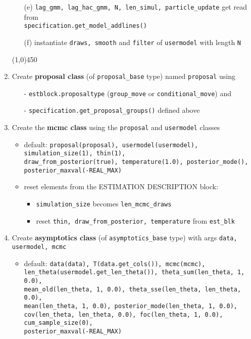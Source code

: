 \documentclass[11pt, letterpaper, notitlepage]{article}
\begin{document}
\begin{enumerate}
\begin{enumerate}
\begin{itemize}
          \end{itemize}
\item[(e)] \texttt{lag\_gmm, lag\_hac\_gmm, N, len\_simul, particle\_update} get read from\\ \texttt{specification.get\_model\_addlines()}
\item[(f)] instantiate \texttt{draws, smooth} and \texttt{filter} of \texttt{usermodel} with length \texttt{N}
\end{enumerate}

\begin{center}
\line(1,0){450}
\end{center}

\item Create \textbf{proposal class} (of \texttt{proposal\_base} type) named \texttt{proposal} using 
\begin{itemize}
\item[-] \texttt{estblock.proposaltype} (\texttt{group\_move} or \texttt{conditional\_move}) and
\item[-] \texttt{specification.get\_proposal\_groups()} defined above
\end{itemize}
 
 \item Create the \textbf{mcmc class} using the \texttt{proposal} and \texttt{usermodel} classes
 \begin{itemize}
 \item default: \texttt{proposal(proposal), usermodel(usermodel), simulation\_size(1), thin(1), \\
               draw\_from\_posterior(true), temperature(1.0), posterior\_mode(), \\ posterior\_maxval(-REAL\_MAX)}
 \item reset elements from the ESTIMATION DESCRIPTION block:
\begin{itemize}
\item \texttt{simulation\_size} becomes \texttt{len\_mcmc\_draws}
\item reset \texttt{thin, draw\_from\_posterior, temperature} from \texttt{est\_blk}
\end{itemize}        
\end{itemize}
\item Create \textbf{asymptotics class} (of \texttt{asymptotics\_base} type) with args \texttt{data, usermodel, mcmc}
\begin{itemize}
\item default: \texttt{data(data), T(data.get\_cols()), mcmc(mcmc), \\
len\_theta(usermodel.get\_len\_theta()), theta\_sum(len\_theta, 1, 0.0), \\ mean\_old(len\_theta, 1, 0.0), theta\_sse(len\_theta, len\_theta, 0.0),\\
              mean(len\_theta, 1, 0.0), posterior\_mode(len\_theta, 1, 0.0), \\ cov(len\_theta, len\_theta, 0.0),
              foc(len\_theta, 1, 0.0), cum\_sample\_size(0), \\ posterior\_maxval(-REAL\_MAX)}
\end{itemize}


\end{enumerate}
\end{document}
